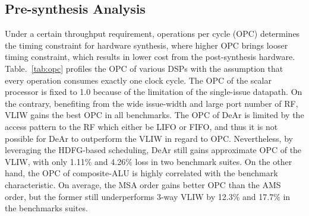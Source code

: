 \subsection{Pre-synthesis Analysis}
    Under a certain throughput requirement, operations per cycle (OPC) determines the timing constraint for hardware synthesis, 
    where higher OPC brings looser timing constraint, which results in lower cost from the post-synthesis hardware.
    Table.~\ref{tab:opc} profiles the OPC of various DSPs with the assumption that every operation consumes exactly one clock cycle.
    The OPC of the scalar processor is fixed to 1.0 because of the limitation of the single-issue datapath.
    On the contrary, benefiting from the wide issue-width and large port number of RF, VLIW gains the best OPC in all benchmarks.
    The OPC of DeAr is limited by the access pattern to the RF which either be LIFO or FIFO, 
    and thus it is not possible for DeAr to outperform the VLIW in regard to OPC.
    Nevertheless, by leveraging the HDFG-based scheduling,
    DeAr still gains approximate OPC of the VLIW, with only 1.11\% and 4.26\% loss in two benchmark suites.
    On the other hand, the OPC of composite-ALU is highly correlated with the benchmark characteristic. 
    On average, the MSA order gains better OPC than the AMS order, 
    but the former still underperforms 3-way VLIW by 12.3\% and 17.7\% in the benchmarks suites.%
\setlength{\textfloatsep}{0pt}%
